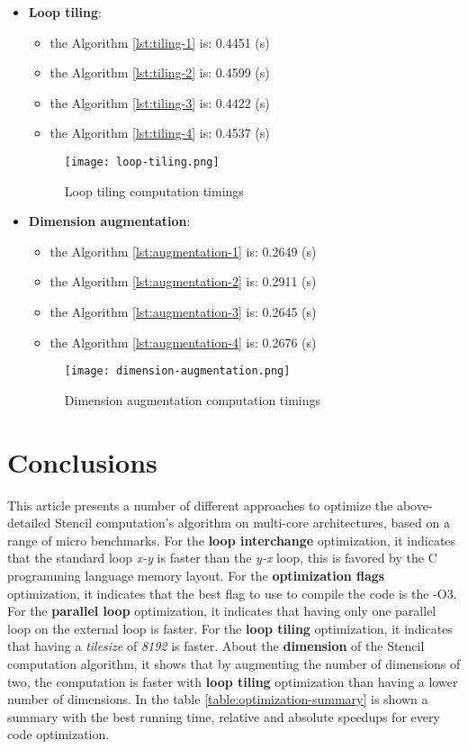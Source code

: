 \documentclass[conference]{IEEEtran}
\begin{document}
\begin{itemize}
\begin{figure}[htbp]
	\end{figure}		
	\item \textbf{Loop tiling}: 
	\begin{itemize}
		\item the Algorithm \ref{lst:tiling-1} is: 0.4451 (s)
		\item the Algorithm \ref{lst:tiling-2} is: 0.4599 (s)
		\item the Algorithm \ref{lst:tiling-3} is: 0.4422 (s)
		\item the Algorithm \ref{lst:tiling-4} is: 0.4537 (s)
	\end{itemize}	
	\begin{figure}[htbp]
		\centering
			\texttt{[image: loop-tiling.png]}
		\caption{Loop tiling computation timings}
		\label{fig:loop-tiling}
	\end{figure}		
	\item \textbf{Dimension augmentation}: 
	\begin{itemize}
		\item the Algorithm \ref{lst:augmentation-1} is: 0.2649 (s)
		\item the Algorithm \ref{lst:augmentation-2} is: 0.2911 (s)
		\item the Algorithm \ref{lst:augmentation-3} is: 0.2645 (s)
		\item the Algorithm \ref{lst:augmentation-4} is: 0.2676 (s)
	\end{itemize}	
	\begin{figure}[htbp]
		\centering
			\texttt{[image: dimension-augmentation.png]}
		\caption{Dimension augmentation computation timings}
		\label{fig:dimension-augmentation}
	\end{figure}
\end{itemize}

\section{Conclusions}
This article presents a number of different approaches to optimize the above-detailed Stencil computation's algorithm on multi-core architectures, based on a range of micro benchmarks.
For the \textbf{loop interchange} optimization, it indicates that the standard loop \textit{x-y} is faster than the \textit{y-x} loop, this is favored by the C programming language memory layout.
For the \textbf{optimization flags} optimization, it indicates that the best flag to use to compile the code is the -O3.
For the \textbf{parallel loop} optimization, it indicates that having only one parallel loop on the external loop is faster.
For the \textbf{loop tiling} optimization, it indicates that having a \textit{tile\textunderscore size} of \textit{8192} is faster.
About the \textbf{dimension} of the Stencil computation algorithm, it shows that by augmenting the number of dimensions of two, the computation is faster with \textbf{loop tiling} optimization than having a lower number of dimensions. In the table \ref{table:optimization-summary} is shown a summary with the best running time, relative and absolute speedups for every code optimization.
\end{document}
